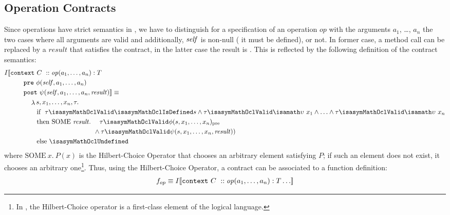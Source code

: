 \subsection{Operation Contracts}
Since operations have strict semantics in \OCL, we have to distinguish for a specification of an
operation $\mathit{op}$ with the arguments $a_1$, \ldots, $a_n$ the
two cases where all arguments are valid and additionally, $\mathit{self}$ is non-null (\ie{} it must be defined), or not. 
In former case, a method call can be replaced by a $\mathit{result}$
that satisfies the contract, in the latter case the result is
. This is reflected by the following definition of the contract semantics:
\begin{gather}\label{eq:contract}
\begin{aligned}
 I\semantics{& \mathtt{context}~C~:: \mathit{op}(a_1, \ldots, a_n) : T \\
                     & \qquad\mathtt{pre}~ \phi(\self, a_1, \ldots, a_n)  \\
                     & \qquad\mathtt{post}~\psi(\self, a_1, \ldots, a_n, \mathit{result})}  \equiv \\
 & \qquad \quad \lambda  s,  x_1, \ldots, x_n, \tau.  \\
 & \qquad\qquad \text{if}  ~ ~ \tau
\isasymMathOclValid \isasymMathOclIsDefined s \land \tau \isasymMathOclValid
\isasymupsilon~x_1 \land \ldots \land  \tau \isasymMathOclValid
\isasymupsilon~ x_n \\
 & \qquad\qquad \text{then} ~ \text{SOME}~ \mathit{result}. ~ ~ ~ ~\tau \isasymMathOclValid \phi(s, x_1, \ldots, x_n)_\text{pre} \\
 & \qquad\qquad\qquad\qquad\qquad\qquad ~ ~          \land \tau \isasymMathOclValid \psi(s, x_1, \ldots, x_n, \mathit{result}))\\
 &\qquad\qquad  \text{else}  ~  \isasymMathOclUndefined
\end{aligned}
\end{gather}
where $\text{SOME}~ x. ~P(x)$ is the Hilbert-Choice Operator that 
chooses an arbitrary element satisfying $P$; if such an element does not exist, it chooses
an arbitrary one\footnote{In \HOL, the Hilbert-Choice operator is a first-class element of
the logical language.}. Thus, using the Hilbert-Choice Operator, a contract can be associated
to a function definition:
\begin{gather}\label{eq:contractdef}
    f_{op}  \equiv I\llbracket  \mathtt{context}~C~:: \mathit{op}(a_1, \ldots, a_n) : T \ldots  \rrbracket
\end{gather}
